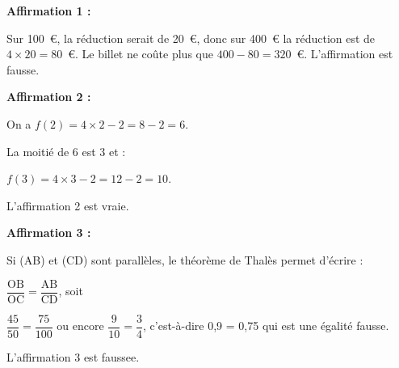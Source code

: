 
\medskip

%

\textbf{Affirmation 1 :}

Sur 100~\euro{}, la réduction serait de 20~\euro, donc sur 400~\euro{} la réduction est de $4 \times 20 = 80$~\euro. Le billet ne coûte plus que $400 - 80 = 320$~\euro. L'affirmation est fausse.
\bigskip

\textbf{Affirmation 2 :}

%
On a $f(2) = 4 \times 2 - 2 = 8 - 2 = 6$.

La moitié de 6 est 3 et :

$f(3) = 4 \times 3 - 2 = 12 - 2 = 10$.

L'affirmation 2 est vraie.
\bigskip


\textbf{Affirmation 3 :}

Si (AB) et (CD) sont parallèles, le théorème de Thalès permet d'écrire :

$\dfrac{\text{OB}}{\text{OC}} = \dfrac{\text{AB}}{\text{CD}}$, soit 

$\dfrac{45}{50} = \dfrac{75}{100}$ ou encore $\dfrac{9}{10} = \dfrac{3}{4}$, c'est-à-dire 0,9 = 0,75 qui est une égalité fausse.

L'affirmation 3 est faussee.
\vspace{0,5cm}

